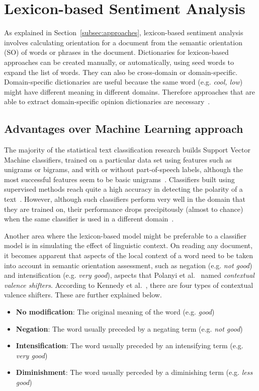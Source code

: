 \section{Lexicon-based Sentiment Analysis}
\label{sec:lexicon}

As explained in Section~\ref{subsec:approaches},
lexicon-based sentiment analysis involves calculating orientation for a document
from the semantic orientation (SO) of words or phrases in the document.
Dictionaries for lexicon-based approaches can be created manually,
or automatically, using seed words to expand the list of words.
They can also be cross-domain or domain-specific.
Domain-specific dictionaries are useful because the same word
(e.g. \emph{cool, low}) might have different meaning in different domains.
Therefore approaches that are able
to extract domain-specific opinion dictionaries are necessary~\cite{AKKN14}.

\subsection{Advantages over Machine Learning approach}
\label{subsec:advantages}

The majority of the statistical text classification research builds
Support Vector Machine classifiers, trained on a particular data set
using features such as unigrams or bigrams,
and with or without part-of-speech labels,
although the most successful features seem to be basic unigrams~\cite{TBTV11}.
Classifiers built using supervised methods reach quite a high accuracy
in detecting the polarity of a text~\cite{CZ05}.
However, although such classifiers perform very well in the domain
that they are trained on,
their performance drops precipitously (almost to chance)
when the same classifier is used in a different domain~\cite{AG05}.

Another area where the lexicon-based model might be preferable
to a classifier model is in simulating the effect of linguistic context.
On reading any document, it becomes apparent that aspects of the local context of a word need to be taken into account in semantic orientation assessment,
such as negation (e.g. \emph{not good})
and intensification (e.g. \emph{very good}),
aspects that Polanyi et al.~\cite{PZ06} named
\emph{contextual valence shifters}.
According to Kennedy et al.~\cite{KI06},
there are four types of contextual valence shifters.
These are further explained below.

\begin{itemize}
 \item \textbf{No modification}: The original meaning of the word
 (e.g. \emph{good})
 \item \textbf{Negation}: The word usually preceded by a negating term
 (e.g. \emph{not good})
 \item \textbf{Intensification}: The word usually preceded by an intensifying term
 (e.g. \emph{very good})
 \item \textbf{Diminishment}: The word usually perceded by a diminishing term
 (e.g. \emph{less good})
\end{itemize}

